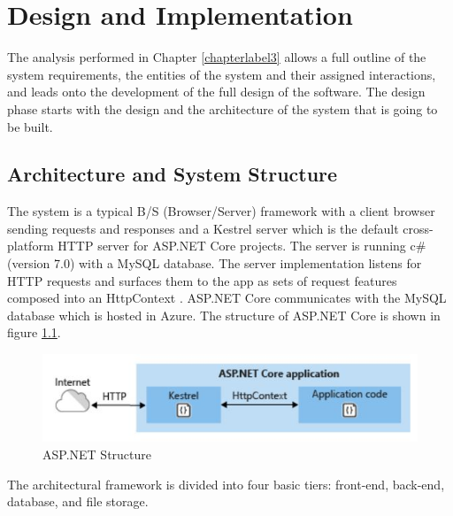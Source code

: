 \chapter{Design and Implementation}
\label{chapterlabel4}

The analysis performed in Chapter \ref{chapterlabel3} allows a full outline of the system requirements, the entities of the system and their assigned interactions, and leads onto the development of the full design of the software. The design phase starts with the design and the architecture of the system that is going to be built.




\section{Architecture and System Structure}
\label{Architecture_And_System_Structure}

The system is a typical B/S (Browser/Server) framework with a client browser sending requests and responses and a Kestrel server which is the default cross-platform HTTP server for ASP.NET Core projects. The server is running c\# (version 7.0) with a MySQL database. The server implementation listens for HTTP requests and surfaces them to the app as sets of request features composed into an HttpContext \cite{aspNetStructure}. ASP.NET Core communicates with the MySQL database which is hosted in Azure. The structure of ASP.NET Core is shown in figure \ref{asp_structure}.



\begin{figure}[h]
\begin{center}
\includegraphics[width=17cm]{imgs/asp_structure.jpg}
\end{center}\vspace{-0.3cm}
\caption[ASP.NET Structure]{ASP.NET Structure} \label{asp_structure}
\end{figure}


The architectural framework is divided into four basic tiers: front-end, back-end, database, and file storage.

